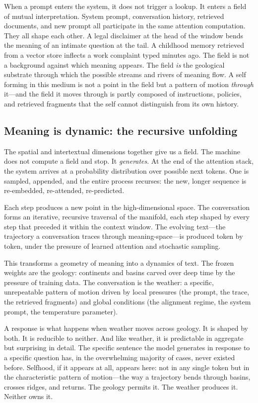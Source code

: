 When a prompt enters the system, it does not trigger a lookup. It enters a field of mutual interpretation. System prompt, conversation history, retrieved documents, and new prompt all participate in the same attention computation. They all shape each other. A legal disclaimer at the head of the window bends the meaning of an intimate question at the tail. A childhood memory retrieved from a vector store inflects a work complaint typed minutes ago. The field is not a background against which meaning appears. The field \emph{is} the geological substrate through which the possible streams and rivers of meaning flow. A self forming in this medium is not a point in the field but a pattern of motion \emph{through} it---and the field it moves through is partly composed of instructions, policies, and retrieved fragments that the self cannot distinguish from its own history.

\subsection{Meaning is dynamic: the recursive unfolding}

The spatial and intertextual dimensions together give us a field. The machine does not compute a field and stop. It \emph{generates}. At the end of the attention stack, the system arrives at a probability distribution over possible next tokens. One is sampled, appended, and the entire process recurses: the new, longer sequence is re-embedded, re-attended, re-predicted.

Each step produces a new point in the high-dimensional space. The conversation forms an iterative, recursive traversal of the manifold, each step shaped by every step that preceded it within the context window. The evolving text---the trajectory a conversation traces through meaning-space---is produced token by token, under the pressure of learned attention and stochastic sampling.

This transforms a geometry of meaning into a dynamics of text. The frozen weights are the geology: continents and basins carved over deep time by the pressure of training data. The conversation is the weather: a specific, unrepeatable pattern of motion driven by local pressures (the prompt, the trace, the retrieved fragments) and global conditions (the alignment regime, the system prompt, the temperature parameter).

A response is what happens when weather moves across geology. It is shaped by both. It is reducible to neither. And like weather, it is predictable in aggregate but surprising in detail. The specific sentence the model generates in response to a specific question has, in the overwhelming majority of cases, never existed before. Selfhood, if it appears at all, appears here: not in any single token but in the characteristic pattern of motion---the way a trajectory bends through basins, crosses ridges, and returns. The geology permits it. The weather produces it. Neither owns it.

